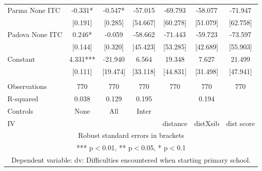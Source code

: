 \begin{tabular}{lcccccc}
Parma None ITC & -0.331* & -0.547* & -57.015 & -69.793 & -58.077 & -71.947 \\
 & [0.191] & [0.285] & [54.667] & [60.278] & [51.079] & [62.758] \\
Padova None ITC & 0.246* & -0.059 & -58.662 & -71.443 & -59.723 & -73.597 \\
 & [0.144] & [0.320] & [45.423] & [53.285] & [42.689] & [55.903] \\
Constant & 4.331*** & -21.940 & 6.564 & 19.348 & 7.627 & 21.499 \\
 & [0.111] & [19.474] & [33.118] & [44.831] & [31.498] & [47.941] \\
 &  &  &  &  &  &  \\
Observations & 770 & 770 & 770 & 770 & 770 & 770 \\
R-squared & 0.038 & 0.129 & 0.195 &  & 0.194 &  \\
Controls & None & All & Inter &  &  &  \\
 IV &  &  &  & distance & distXsib & dist score \\ \hline
\multicolumn{7}{c}{ Robust standard errors in brackets} \\
\multicolumn{7}{c}{ *** p$<$0.01, ** p$<$0.05, * p$<$0.1} \\
\multicolumn{7}{c}{ Dependent variable: dv: Difficulties encountered when starting primary school.} \\
\end{tabular}
